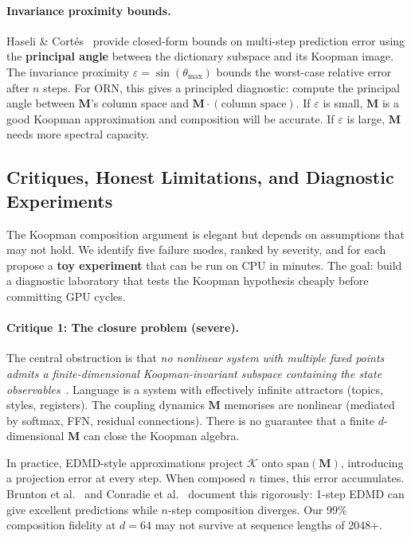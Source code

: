 \documentclass[11pt, a4paper]{article}
\newcommand{\M}{\mathbf{M}}
\theoremstyle{plain}
\theoremstyle{remark}
\begin{document}
\paragraph{Invariance proximity bounds.}
Haseli \& Cort\'{e}s~\cite{haseli2023invariance} provide closed-form bounds on multi-step prediction error using the \textbf{principal angle} between the dictionary subspace and its Koopman image.
The invariance proximity $\varepsilon = \sin(\theta_{\max})$ bounds the worst-case relative error after $n$ steps.
For ORN, this gives a principled diagnostic: compute the principal angle between $\M$'s column space and $\M \cdot (\text{column space})$.
If $\varepsilon$ is small, $\M$ is a good Koopman approximation and composition will be accurate.
If $\varepsilon$ is large, $\M$ needs more spectral capacity.

\subsection{Critiques, Honest Limitations, and Diagnostic Experiments}

The Koopman composition argument is elegant but depends on assumptions that may not hold.
We identify five failure modes, ranked by severity, and for each propose a \textbf{toy experiment} that can be run on CPU in minutes.
The goal: build a diagnostic laboratory that tests the Koopman hypothesis cheaply before committing GPU cycles.

\paragraph{Critique 1: The closure problem (severe).}
The central obstruction is that \emph{no nonlinear system with multiple fixed points admits a finite-dimensional Koopman-invariant subspace containing the state observables}~\cite{brunton2016koopman}.
Language is a system with effectively infinite attractors (topics, styles, registers).
The coupling dynamics $\M$ memorises are nonlinear (mediated by softmax, FFN, residual connections).
There is no guarantee that a finite $d$-dimensional $\M$ can close the Koopman algebra.

In practice, EDMD-style approximations project $\mathcal{K}$ onto $\text{span}(\M)$, introducing a projection error at every step.
When composed $n$ times, this error accumulates.
Brunton et al.~\cite{brunton2016koopman} and Conradie et al.~\cite{conradie2026trustworthy} document this rigorously: 1-step EDMD can give excellent predictions while $n$-step composition diverges.
Our 99\% composition fidelity at $d{=}64$ may not survive at sequence lengths of 2048+.
\end{document}
